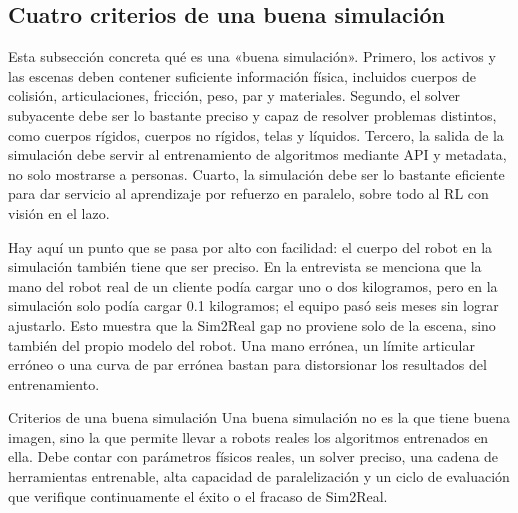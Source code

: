 \subsection{Cuatro criterios de una buena simulación}

Esta subsección concreta qué es una «buena simulación». Primero, los activos y las escenas deben contener suficiente información física, incluidos cuerpos de colisión, articulaciones, fricción, peso, par y materiales. Segundo, el solver subyacente debe ser lo bastante preciso y capaz de resolver problemas distintos, como cuerpos rígidos, cuerpos no rígidos, telas y líquidos. Tercero, la salida de la simulación debe servir al entrenamiento de algoritmos mediante API y metadata, no solo mostrarse a personas. Cuarto, la simulación debe ser lo bastante eficiente para dar servicio al aprendizaje por refuerzo en paralelo, sobre todo al RL con visión en el lazo.

Hay aquí un punto que se pasa por alto con facilidad: el cuerpo del robot en la simulación también tiene que ser preciso. En la entrevista se menciona que la mano del robot real de un cliente podía cargar uno o dos kilogramos, pero en la simulación solo podía cargar 0.1 kilogramos; el equipo pasó seis meses sin lograr ajustarlo. Esto muestra que la Sim2Real gap no proviene solo de la escena, sino también del propio modelo del robot. Una mano errónea, un límite articular erróneo o una curva de par errónea bastan para distorsionar los resultados del entrenamiento.

\begin{importantbox}{Criterios de una buena simulación}
Una buena simulación no es la que tiene buena imagen, sino la que permite llevar a robots reales los algoritmos entrenados en ella. Debe contar con parámetros físicos reales, un solver preciso, una cadena de herramientas entrenable, alta capacidad de paralelización y un ciclo de evaluación que verifique continuamente el éxito o el fracaso de Sim2Real.
\end{importantbox}

